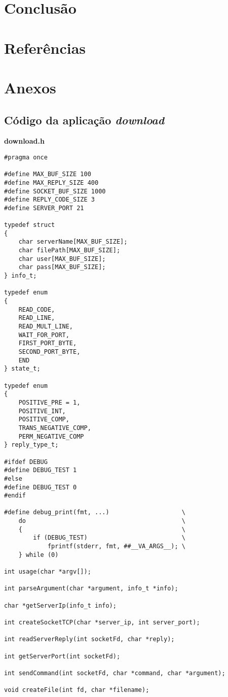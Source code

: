 \documentclass{article}
\begin{document}
\section{Conclusão}
\section{Referências}
\section{Anexos}
\subsection{Código da aplicação \textit{download}}
\textbf{download.h}
\begin{verbatim}
#pragma once

#define MAX_BUF_SIZE 100
#define MAX_REPLY_SIZE 400
#define SOCKET_BUF_SIZE 1000
#define REPLY_CODE_SIZE 3
#define SERVER_PORT 21

typedef struct
{
    char serverName[MAX_BUF_SIZE];
    char filePath[MAX_BUF_SIZE];
    char user[MAX_BUF_SIZE];
    char pass[MAX_BUF_SIZE];
} info_t;

typedef enum
{
    READ_CODE,
    READ_LINE,
    READ_MULT_LINE,
    WAIT_FOR_PORT,
    FIRST_PORT_BYTE,
    SECOND_PORT_BYTE,
    END
} state_t;

typedef enum
{
    POSITIVE_PRE = 1,
    POSITIVE_INT,
    POSITIVE_COMP,
    TRANS_NEGATIVE_COMP,
    PERM_NEGATIVE_COMP
} reply_type_t;

#ifdef DEBUG
#define DEBUG_TEST 1
#else
#define DEBUG_TEST 0
#endif

#define debug_print(fmt, ...)                    \
    do                                           \
    {                                            \
        if (DEBUG_TEST)                          \
            fprintf(stderr, fmt, ##__VA_ARGS__); \
    } while (0)

int usage(char *argv[]);

int parseArgument(char *argument, info_t *info);

char *getServerIp(info_t info);

int createSocketTCP(char *server_ip, int server_port);

int readServerReply(int socketFd, char *reply);

int getServerPort(int socketFd);

int sendCommand(int socketFd, char *command, char *argument);

void createFile(int fd, char *filename);
\end{verbatim}
\end{document}
